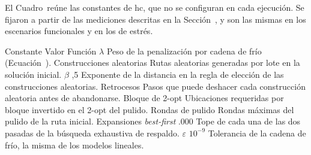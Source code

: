 \startsection[title={Calibración de Hill Climbing}, reference=sec:calib_hc]

\startsubsection[title={Constantes de la implementación}, reference=sec:calib_hc_constantes]

El Cuadro~ reúne las constantes de \ac{hc}, que no se
configuran en cada ejecución. Se fijaron a partir de las mediciones
descritas en la Sección~, y son las mismas en los escenarios
funcionales y en los de estrés.

\startplacetable[reference=tab:hc_constantes, location=here, title={Constantes de implementación de \ac{hc}.}]
\bTABLE[split=yes, align=middle, frame=on, width=fit]
\setupTABLE[row][1][background=color, backgroundcolor=darkgray, style=bold]
\setupTABLE[column][2][align=flushright]
\setupTABLE[column][3][width=8cm, align=flushleft]
\bTR \bTH Constante \eTH \bTH Valor \eTH \bTH Función \eTH \eTR
\bTR \bTD $\lambda$ \eTD {} \eTD \bTD Peso de la penalización por cadena de frío (Ecuación~\in[eq:hc_costo]). \eTD \eTR
\bTR \bTD Construcciones aleatorias \eTD {} \eTD \bTD Rutas aleatorias generadas por lote en la solución inicial. \eTD \eTR
\bTR \bTD $\beta$ \eTD {},5 \eTD \bTD Exponente de la distancia en la regla de elección de las construcciones aleatorias. \eTD \eTR
\bTR \bTD Retrocesos \eTD {} \eTD \bTD Pasos que puede deshacer cada construcción aleatoria antes de abandonarse. \eTD \eTR
\bTR \bTD Bloque de 2-opt \eTD {} \eTD \bTD Ubicaciones requeridas por bloque invertido en el 2-opt del pulido. \eTD \eTR
\bTR \bTD Rondas de pulido \eTD {} \eTD \bTD Rondas máximas del pulido de la ruta inicial. \eTD \eTR
\bTR \bTD Expansiones {\em best-first} \eTD {}.000 \eTD \bTD Tope de cada una de las dos pasadas de la búsqueda exhaustiva de respaldo. \eTD \eTR
\bTR \bTD $\varepsilon$ \eTD \bTD $10^{-9}$ \eTD \bTD Tolerancia de la cadena de frío, la misma de los modelos lineales. \eTD \eTR
\eTABLE
\stopplacetable

\stopsubsection

\startsubsection[title={Presupuesto de búsqueda}, reference=sec:calib_hc_presupuesto]

